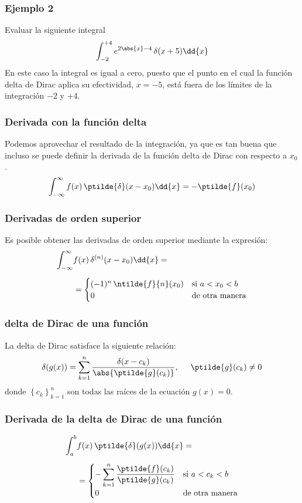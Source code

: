 \begin{frame}
\frametitle{Ejemplo 2}
Evaluar la siguiente integral
\begin{align*}
\int_{-2}^{+4} e^{2 \abs{x}-4} \, \delta(x + 5) \dd{x}
\end{align*}
\pause
En este caso la integral es igual a cero, puesto que el punto en el cual la función delta de Dirac aplica su efectividad, $x = -5$, está fuera de los límites de la integración $-2$ y $+4$.
\end{frame}
\begin{frame}
\frametitle{Derivada con la función delta}
Podemos aprovechar el resultado de la integración, ya que es tan buena que incluso se puede definir la derivada de la función delta de Dirac con respecto a $x_{0}$.
\begin{align*}
\int_{-\infty}^{\infty} f(x) \, \ptilde{\delta} (x - x_{0}) \dd{x} = - \ptilde{f}(x_{0})
\end{align*}
\end{frame}
\begin{frame}
\frametitle{Derivadas de orden superior}
Es posible obtener las derivadas de orden superior mediante la expresión:
\begin{align*}
\int_{-\infty}^{\infty} &f(x) \, \delta^{(n)} (x - x_{0}) \dd{x} = \\[0.5em]
&= \begin{cases}
(-1)^{n} \, \ntilde{f}{n} (x_{0}) & \mbox{si } a < x_{0} < b \\
0 & \mbox{de otra manera}
\end{cases}
\end{align*}   
\end{frame}
\begin{frame}
\frametitle{delta de Dirac de una función}
La delta de Dirac satisface la siguiente relación:
\begin{align*}
\delta(g(x)) = \sum_{k=1}^{n} \dfrac{\delta(x - c_{k})}{\abs{\ptilde{g}(c_{k})}}, \hspace{0.5cm} \ptilde{g}(c_{k}) \neq 0
\end{align*}
donde $\left\{ c_{k} \right\}_{k=1}^{n}$ son todas las raíces de la ecuación $g(x) = 0$.
\end{frame}
\begin{frame}
\frametitle{Derivada de la delta de Dirac de una función}
\begin{align*}
\int_{a}^{b} &f(x) \, \ptilde{\delta}(g(x)) \dd{x} = \\[0.5em]
&= \begin{cases}
- \displaystyle \sum_{k=1}^{n} \dfrac{\ptilde{f}(c_{k})}{\ptilde{g}(c_{k})} & \mbox{si } a < c_{k} < b \\
0 & \mbox{de otra manera}
\end{cases}
\end{align*}
\end{frame}
